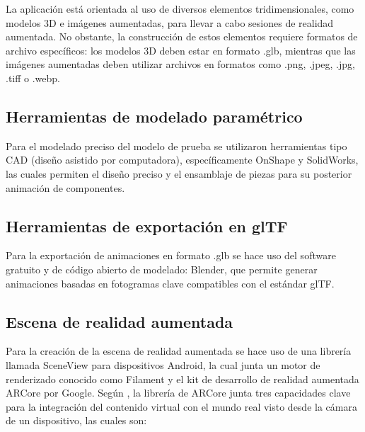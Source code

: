         La aplicación está orientada al uso de diversos elementos tridimensionales, como modelos 3D e imágenes aumentadas, para llevar a cabo sesiones de realidad aumentada. No obstante, la construcción de estos elementos requiere formatos de archivo específicos: los modelos 3D deben estar en formato .glb, mientras que las imágenes aumentadas deben utilizar archivos en formatos como .png, .jpeg, .jpg, .tiff o .webp.

    \subsection{Herramientas de modelado paramétrico}

        Para el modelado preciso del modelo de prueba se utilizaron herramientas tipo CAD (diseño asistido por computadora), específicamente OnShape y SolidWorks, las cuales permiten el diseño preciso y el ensamblaje de piezas para su posterior animación de componentes.
        
    \subsection{Herramientas de exportación en glTF}

        Para la exportación de animaciones en formato .glb se hace uso del software gratuito y de código abierto de modelado: Blender, que permite generar animaciones basadas en fotogramas clave compatibles con el estándar glTF.

    \subsection{Escena de realidad aumentada}

        Para la creación de la escena de realidad aumentada se hace uso de una librería llamada SceneView para dispositivos Android, la cual junta un motor de renderizado conocido como Filament y el kit de desarrollo de realidad aumentada ARCore por Google. Según \textcite{GOOGLE:2024}, la librería de ARCore junta tres capacidades clave para la integración del contenido virtual con el mundo real visto desde la cámara de un dispositivo, las cuales son:

